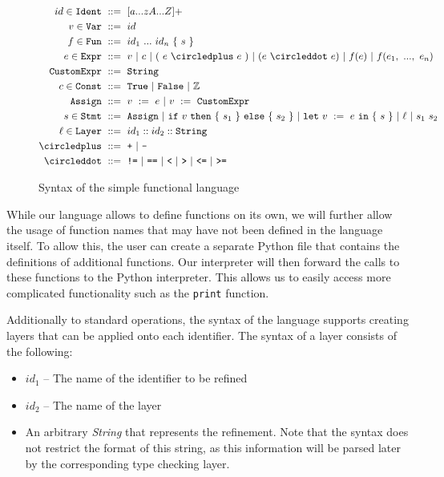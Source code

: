 \documentclass[acmsmall, review, screen]{acmart}
\begin{document}
\begin{figure}[ht!]
\begin{align*}
	id \in \texttt{Ident}\ 	&::=\ [a...zA...Z]+ \\
	v \in \texttt{Var}\ 	&::=\ id \\
	f \in \texttt{Fun}\ 	&::=\ id_1\ ...\ id_n\ \{\ s\ \}\\
	e \in \texttt{Expr}\ 	&::=\ v\ |\ c\ |\ (\ e\ \circledplus\ e\ )\ |\ (e\ \circleddot\ e)\ |\ f(e)\ |\ f(e_1,\ ...,\ e_n)  \\
	\texttt{CustomExpr}\ 	&::=\ \texttt{String}\\
	c \in \texttt{Const}\ 	&::=\ \texttt{True}\ |\ \texttt{False}\ |\ \mathbb{Z} \\
	\texttt{Assign}\ 	&::=\ v\ :=\ e\ |\ v\ :=\ \texttt{CustomExpr}\ \\
	s \in \texttt{Stmt}\ 	&::=\ \texttt{Assign}\ |\ \texttt{if}\ v\ \texttt{then}\ \lbrace\ s_1\ \rbrace\ \texttt{else}\ \lbrace\ s_2\ \rbrace\ |\ \texttt{let}\ v\ :=\ e\ \texttt{in}\ \lbrace\ s\ \rbrace\ |\ \ell\ |\ s_1\ s_2\ \\
	\ell \in \texttt{Layer}\ 	&::=\ id_1::id_2::\texttt{String} \\
	\circledplus\ 		&::=\ \texttt{+}\ |\ \texttt{-} \\
	\circleddot\ 		&::=\ \texttt{!=}\ |\ \texttt{==}\ |\ \texttt{<} \ |\ \texttt{>} \ |\ \texttt{<=} \ |\ \texttt{>=} \\
\end{align*}
\caption{Syntax of the simple functional language}
\label{fig:lang}
\end{figure}

While our language allows to define functions on its own, we will further allow the usage of function names that may have not been defined in the language itself. To allow this, the user can create a separate Python file that contains the definitions of additional functions. Our interpreter will then forward the calls to these functions to the Python interpreter. This allows us to easily access more complicated functionality such as the \texttt{print} function.

Additionally to standard operations, the syntax of the language supports creating layers that can be applied onto each identifier. The syntax of a layer consists of the following:
\begin{itemize}
	\item $id_1$ -- The name of the identifier to be refined
	\item $id_2$ -- The name of the layer
	\item An arbitrary \textit{String} that represents the refinement. Note that the syntax does not restrict the format of this string, as this information will be parsed later by the corresponding type checking layer.
\end{itemize}
\end{document}
